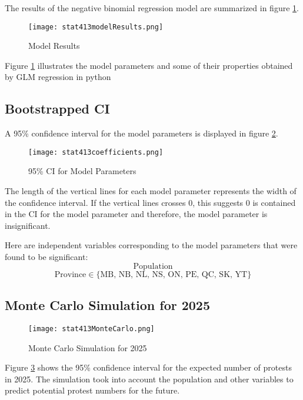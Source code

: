\documentclass{article}
\begin{document}
The results of the negative binomial regression model are summarized in figure \ref{fig:model_results}. 

\begin{figure}[h]
    \centering
    \texttt{[image: stat413modelResults.png]}
    \caption{Model Results}
    \label{fig:model_results}
\end{figure}

Figure \ref{fig:model_results} illustrates the model parameters and some of their properties obtained by GLM regression in python

\subsection{Bootstrapped CI}

A 95\% confidence interval for the model parameters is displayed in figure \ref{fig:coefficients}.

\begin{figure}[h]
    \centering
    \texttt{[image: stat413coefficients.png]}
    \caption{95\% CI for Model Parameters}
    \label{fig:coefficients}
\end{figure}

The length of the vertical lines for each model parameter represents the width of the confidence interval. If the vertical lines crosses 0, this suggests 0 is contained in the CI for the model parameter and therefore, the model parameter is insignificant.

Here are independent variables corresponding to the model parameters that were found to be significant: 
\[\text{Population}\]
\[\text{Province} \in \{ \text{MB, NB, NL, NS, ON, PE, QC, SK, YT} \}\]

\subsection{Monte Carlo Simulation for 2025}


\begin{figure}[h]
    \centering
    \texttt{[image: stat413MonteCarlo.png]}
    \caption{Monte Carlo Simulation for 2025}
    \label{fig:monte_carlo}
\end{figure}

Figure \ref{fig:monte_carlo} shows the 95\% confidence interval for the expected number of protests in 2025. The simulation took into account the population and other variables to predict potential protest numbers for the future.
\end{document}
